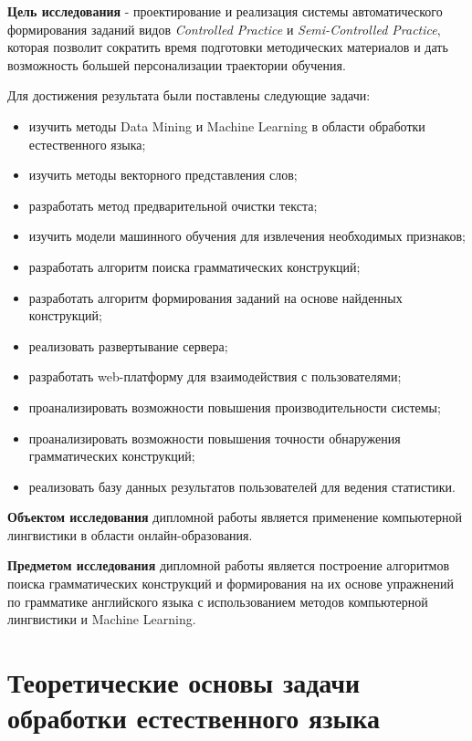 \textbf{Цель исследования} - проектирование и реализация системы автоматического формирования заданий видов \emph{Controlled Practice} и \emph{Semi-Controlled Practice}, которая позволит сократить время подготовки методических материалов и дать возможность большей персонализации траектории обучения.

Для достижения результата были поставлены следующие задачи:

\begin{itemize}
  \item изучить методы Data Mining и Machine Learning в области обработки естественного языка; 
  \item изучить методы векторного представления слов;
  \item разработать метод предварительной очистки текста;
  \item изучить модели машинного обучения для извлечения необходимых признаков;
  \item разработать алгоритм поиска грамматических конструкций;
  \item разработать алгоритм формирования заданий на основе найденных конструкций;
  \item реализовать развертывание сервера;
  \item разработать web-платформу для взаимодействия с пользователями;
  \item проанализировать возможности повышения производительности системы;
  \item проанализировать возможности повышения точности обнаружения грамматических конструкций;
  \item реализовать базу данных результатов пользователей для ведения статистики.
\end{itemize}

\textbf{Объектом исследования} дипломной работы является применение компьютерной лингвистики в области онлайн-образования.

\textbf{Предметом исследования} дипломной работы является построение алгоритмов поиска грамматических конструкций и формирования на их основе упражнений по грамматике английского языка с использованием методов компьютерной лингвистики и Machine Learning.

\newpage
\section{Теоретические основы задачи обработки естественного языка}
\label{sec:theory}

